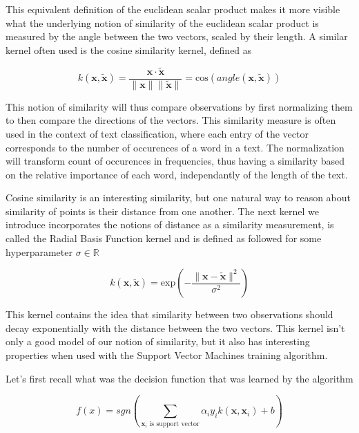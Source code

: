 This equivalent definition of the euclidean scalar product makes it more visible what the underlying notion of similarity of the euclidean scalar product is measured by the angle between the two vectors, scaled by their length. A similar kernel often used is the cosine similarity kernel, defined as

\begin{equation*}
  k(\mathbf{x}, \mathbf{\tilde{x}}) = \frac{\mathbf{x} \cdot \mathbf{\tilde{x}}}{\|\mathbf{x}\|\|\mathbf{\tilde{x}}\|} = \text{cos}\left(angle\left(\mathbf{x}, \mathbf{\tilde{x}}\right)\right)
\end{equation*}

This notion of similarity will thus compare observations by first normalizing them to then compare the directions of the vectors. This similarity measure is often used in the context of text classification, where each entry of the vector corresponds to the number of occurences of a word in a text. The normalization will transform count of occurences in frequencies, thus having a similarity based on the relative importance of each word, independantly of the length of the text.

Cosine similarity is an interesting similarity, but one natural way to reason about similarity of points is their distance from one another. The next kernel we introduce incorporates the notions of distance as a similarity measurement, is called the Radial Basis Function kernel and is defined as followed for some hyperparameter $\sigma \in \mathbb{R}$

\begin{equation*}
  k(\mathbf{x}, \mathbf{\tilde{x}}) = \text{exp}\left(-\frac{\|\mathbf{x} - \mathbf{\tilde{x}}\|^2}{\sigma^2}\right)
\end{equation*}

This kernel contains the idea that similarity between two observations should decay exponentially with the distance between the two vectors. This kernel isn't only a good model of our notion of similarity, but it also has interesting properties when used with the Support Vector Machines training algorithm.

Let's first recall what was the decision function that was learned by the algorithm

\begin{equation*}
  f\left(x\right) = sgn\left(\sum_{\mathbf{x}_i \text{ is support vector}}\alpha_iy_ik\left(\mathbf{x}, \mathbf{x}_i\right) + b\right)
\end{equation*}

